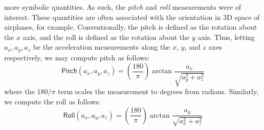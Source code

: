 more symbolic quantities. As such, the \textit{pitch} and \textit{roll} measurements were of
interest. These quantities are often associated with the orientation in 3D space of airplanes, for
example. Conventionally, the pitch is defined as the rotation about the $x$ axis, and the roll is
defined as the rotation about the $y$ axis. Thus, letting $a_x, a_y, a_z$ be the acceleration
measurements along the $x$, $y$, and $z$ axes respectively, we may compute pitch as follows:
\begin{equation}
	\mathsf{Pitch}(a_x,a_y,a_z) = \left(\frac{180}{\pi}\right)\arctan\frac{a_x}{\sqrt{a_y^2+a_z^2}}
\end{equation}
where the $180/\pi$ term scales the measurement to degrees from radians. Similarly, we compute the
roll as follows:
\begin{equation}
	\mathsf{Roll}(a_x,a_y,a_z) = \left(\frac{180}{\pi}\right)\arctan\frac{a_y}{\sqrt{a_x^2+a_z^2}}
\end{equation}

